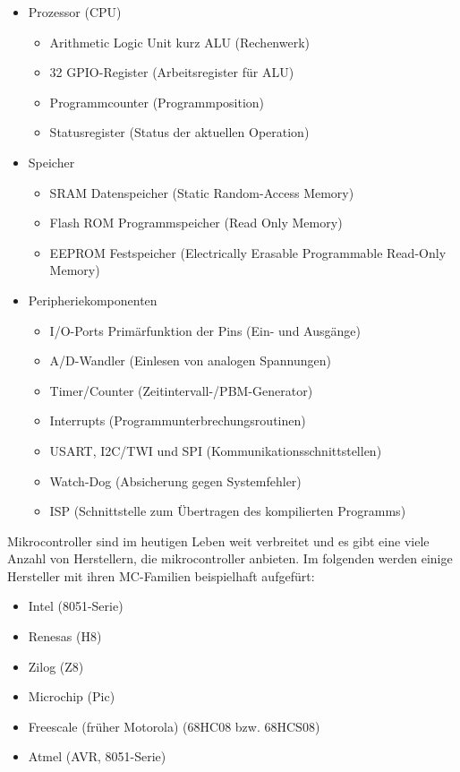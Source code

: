 \begin{itemize}
\item Prozessor (CPU)
\begin{itemize}
          \item Arithmetic Logic Unit kurz ALU (Rechenwerk)
          \item 32 GPIO-Register (Arbeitsregister f\"ur ALU)
          \item Programmcounter (Programmposition)
					\item Statusregister (Status der aktuellen Operation) 
\end{itemize}
\item Speicher
\begin{itemize}
          \item SRAM Datenspeicher (Static Random-Access Memory)
					\item Flash ROM Programmspeicher (Read Only Memory)
					\item EEPROM Festspeicher (Electrically Erasable Programmable Read-Only Memory)
\end{itemize}
\item Peripheriekomponenten
    \begin{itemize}
          \item I/O-Ports Prim\"arfunktion der Pins (Ein- und Ausg\"ange)
          \item A/D-Wandler (Einlesen von analogen Spannungen)
          \item Timer/Counter (Zeitintervall-/PBM-Generator)
					\item Interrupts (Programmunterbrechungsroutinen)
					\item USART, I2C/TWI und SPI (Kommunikationsschnittstellen)
					\item Watch-Dog (Absicherung gegen Systemfehler)
					\item ISP (Schnittstelle zum \"{U}bertragen des kompilierten Programms)
	\end{itemize}
\end{itemize}
Mikrocontroller sind im heutigen Leben weit verbreitet und es gibt eine viele Anzahl von Herstellern, die mikrocontroller anbieten.
Im folgenden werden einige Hersteller mit ihren MC-Familien beispielhaft aufgef\"urt:
\begin{itemize}
\item Intel (8051-Serie)
\item Renesas (H8)
\item Zilog (Z8)
\item Microchip (Pic)
\item Freescale (fr\"uher Motorola) (68HC08 bzw. 68HCS08)
\item Atmel (AVR, 8051-Serie)
\end{itemize}
